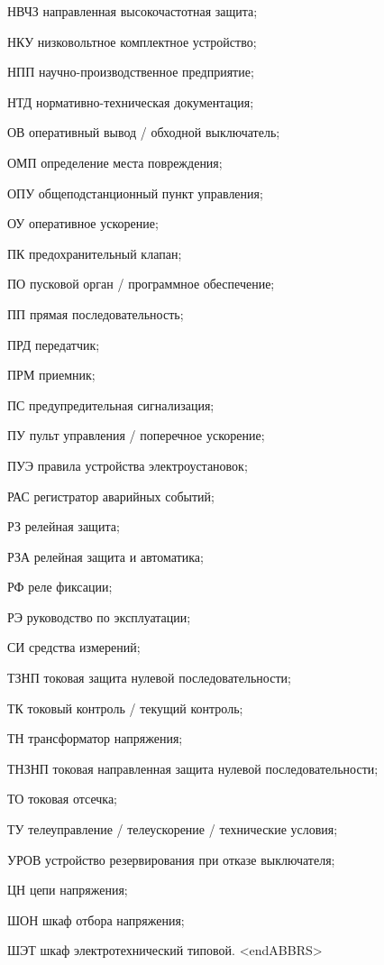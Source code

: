 \begin{list}{}
\item[НВЧЗ] направленная высокочастотная защита;
\item[НКУ] низковольтное комплектное устройство;
\item[НПП] научно-производственное предприятие;
\item[НТД] нормативно-техническая документация;
\item[ОВ] оперативный вывод / обходной выключатель;
\item[ОМП] определение места повреждения;
\item[ОПУ] общеподстанционный пункт управления;
\item[ОУ] оперативное ускорение;
\item[ПК] предохранительный клапан;
\item[ПО] пусковой орган / программное обеспечение;
\item[ПП] прямая последовательность;
\item[ПРД] передатчик;
\item[ПРМ] приемник;
\item[ПС] предупредительная сигнализация;
\item[ПУ] пульт управления / поперечное ускорение;
\item[ПУЭ] правила устройства электроустановок;
\item[РАС] регистратор аварийных событий;
\item[РЗ] релейная защита;
\item[РЗА] релейная защита и автоматика;
\item[РФ] реле фиксации;
\item[РЭ] руководство по эксплуатации;
\item[СИ] средства измерений;
\item[ТЗНП] токовая защита нулевой последовательности;
\item[ТК] токовый контроль / текущий контроль;
\item[ТН] трансформатор напряжения;
\item[ТНЗНП] токовая направленная защита нулевой последовательности;
\item[ТО] токовая отсечка;
\item[ТУ] телеуправление / телеускорение / технические условия;
\item[УРОВ] устройство резервирования при отказе выключателя;
\item[ЦН] цепи напряжения;
\item[ШОН] шкаф отбора напряжения;
\item[ШЭТ] шкаф электротехнический типовой.
{\color{white}\fontsize{0.1pt}{0.1pt}\selectfont<endABBRS>}
\end{list}
